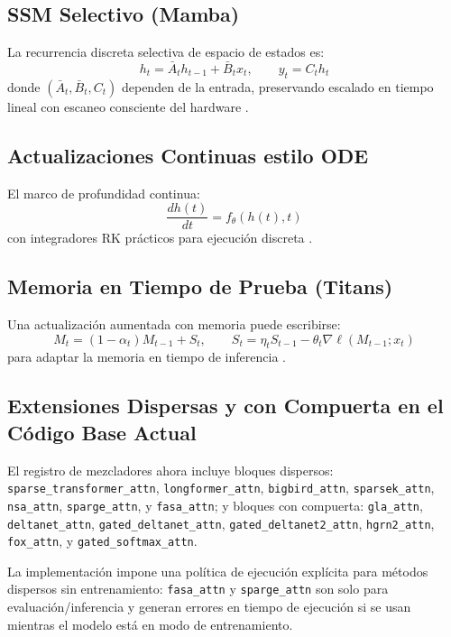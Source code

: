 \documentclass[11pt,a4paper]{article}
\begin{document}
\subsection{SSM Selectivo (Mamba)}
La recurrencia discreta selectiva de espacio de estados es:
\[
h_t=\bar{A}_t h_{t-1}+\bar{B}_t x_t,\qquad y_t=C_t h_t
\]
donde $(\bar{A}_t,\bar{B}_t,C_t)$ dependen de la entrada, preservando escalado en tiempo lineal con escaneo consciente del hardware \citep{gu_mamba_2023,hwang_hydra_2024}.

\subsection{Actualizaciones Continuas estilo ODE}
El marco de profundidad continua:
\[
\frac{dh(t)}{dt}=f_\theta(h(t),t)
\]
con integradores RK prácticos para ejecución discreta \citep{zhang_continuous_2021}.

\subsection{Memoria en Tiempo de Prueba (Titans)}
Una actualización aumentada con memoria puede escribirse:
\[
M_t=(1-\alpha_t)M_{t-1}+S_t,\qquad
S_t=\eta_t S_{t-1}-\theta_t\nabla \ell(M_{t-1};x_t)
\]
para adaptar la memoria en tiempo de inferencia \citep{behrouz_titans_2025,behrouz_titans_2024}.

\subsection{Extensiones Dispersas y con Compuerta en el Código Base Actual}
El registro de mezcladores ahora incluye bloques dispersos:
\texttt{sparse\_transformer\_attn}, \texttt{longformer\_attn}, \texttt{bigbird\_attn},
\texttt{sparsek\_attn}, \texttt{nsa\_attn}, \texttt{sparge\_attn}, y \texttt{fasa\_attn};
y bloques con compuerta:
\texttt{gla\_attn}, \texttt{deltanet\_attn}, \texttt{gated\_deltanet\_attn},
\texttt{gated\_deltanet2\_attn}, \texttt{hgrn2\_attn}, \texttt{fox\_attn}, y \texttt{gated\_softmax\_attn}.

La implementación impone una política de ejecución explícita para métodos dispersos sin entrenamiento:
\texttt{fasa\_attn} y \texttt{sparge\_attn} son solo para evaluación/inferencia y generan errores en tiempo de ejecución si se usan mientras el modelo está en modo de entrenamiento.
\end{document}
